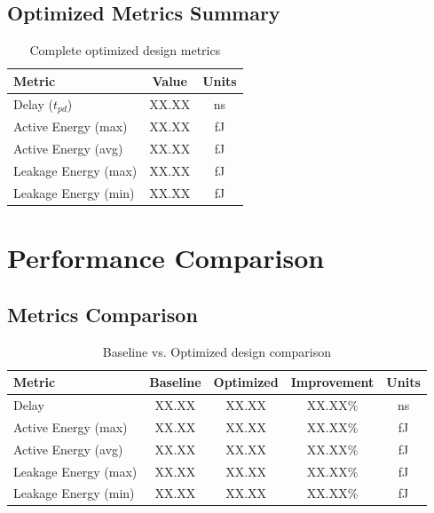\documentclass[12pt,letterpaper]{article}
\begin{document}
\subsection{Optimized Metrics Summary}

\begin{table}[H]
\centering
\caption{Complete optimized design metrics}
\label{tab:optimized_summary}
\begin{tabular}{@{}lcc@{}}
\toprule
\textbf{Metric} & \textbf{Value} & \textbf{Units} \\
\midrule
Delay ($t_{pd}$) & XX.XX & ns \\
Active Energy (max) & XX.XX & fJ \\
Active Energy (avg) & XX.XX & fJ \\
Leakage Energy (max) & XX.XX & fJ \\
Leakage Energy (min) & XX.XX & fJ \\
\bottomrule
\end{tabular}
\end{table}

\section{Performance Comparison}
\label{sec:comparison}


\subsection{Metrics Comparison}

\begin{table}[H]
\centering
\caption{Baseline vs. Optimized design comparison}
\label{tab:comparison}
\begin{tabular}{@{}lcccc@{}}
\toprule
\textbf{Metric} & \textbf{Baseline} & \textbf{Optimized} & \textbf{Improvement} & \textbf{Units} \\
\midrule
Delay & XX.XX & XX.XX & XX.XX\% & ns \\
Active Energy (max) & XX.XX & XX.XX & XX.XX\% & fJ \\
Active Energy (avg) & XX.XX & XX.XX & XX.XX\% & fJ \\
Leakage Energy (max) & XX.XX & XX.XX & XX.XX\% & fJ \\
Leakage Energy (min) & XX.XX & XX.XX & XX.XX\% & fJ \\
\bottomrule
\end{tabular}
\end{table}
\end{document}

